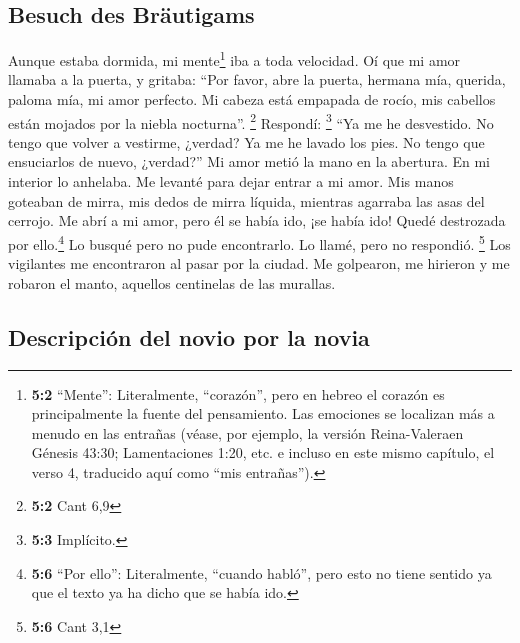 \hypertarget{besuch-des-bruxe4utigams}{%
\subsection{Besuch des Bräutigams}\label{besuch-des-bruxe4utigams}}

 Aunque estaba dormida, mi mente\footnote{\textbf{5:2}
  ``Mente'': Literalmente, ``corazón'', pero en hebreo el corazón es
  principalmente la fuente del pensamiento. Las emociones se localizan
  más a menudo en las entrañas (véase, por ejemplo, la versión
  Reina-Valeraen Génesis 43:30; Lamentaciones 1:20, etc. e incluso en
  este mismo capítulo, el verso 4, traducido aquí como ``mis
  entrañas'').} iba a toda velocidad. Oí que mi amor llamaba a la
puerta, y gritaba: ``Por favor, abre la puerta, hermana mía, querida,
paloma mía, mi amor perfecto. Mi cabeza está empapada de rocío, mis
cabellos están mojados por la niebla nocturna''. \footnote{\textbf{5:2}
  Cant 6,9}  Respondí: \footnote{\textbf{5:3} Implícito.}
``Ya me he desvestido. No tengo que volver a vestirme, ¿verdad? Ya me he
lavado los pies. No tengo que ensuciarlos de nuevo, ¿verdad?''
 Mi amor metió la mano en la abertura. En mi interior lo
anhelaba.  Me levanté para dejar entrar a mi amor. Mis
manos goteaban de mirra, mis dedos de mirra líquida, mientras agarraba
las asas del cerrojo.  Me abrí a mi amor, pero él se había
ido, ¡se había ido! Quedé destrozada por ello.\footnote{\textbf{5:6}
  ``Por ello'': Literalmente, ``cuando habló'', pero esto no tiene
  sentido ya que el texto ya ha dicho que se había ido.} Lo busqué pero
no pude encontrarlo. Lo llamé, pero no respondió. \footnote{\textbf{5:6}
  Cant 3,1}  Los vigilantes me encontraron al pasar por la
ciudad. Me golpearon, me hirieron y me robaron el manto, aquellos
centinelas de las murallas.

\hypertarget{descripciuxf3n-del-novio-por-la-novia}{%
\subsection{Descripción del novio por la
novia}\label{descripciuxf3n-del-novio-por-la-novia}}

